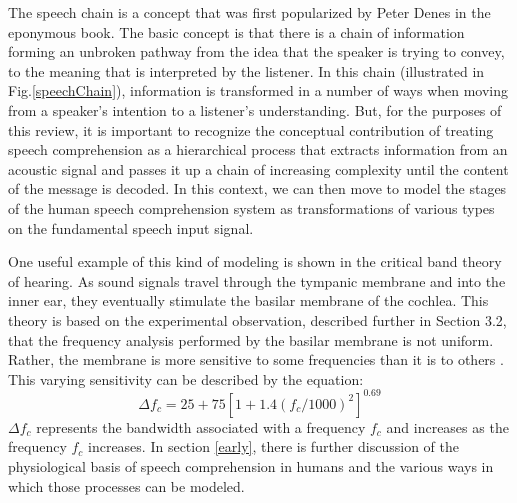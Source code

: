 \documentclass[titlepage]{article}
\begin{document}
    The speech chain is a concept that was first popularized by Peter Denes \cite{Denes1993}
    in the eponymous book. The basic concept is that there is a chain of information forming
    an unbroken pathway from the idea that the speaker is trying to convey, to the meaning that
    is interpreted by the listener. In this chain (illustrated in Fig.\ref{speechChain}), information
    is transformed in a number of ways when moving from a speaker's intention to a listener's
    understanding. But, for the purposes of this review, it is important to recognize the
    conceptual contribution of treating speech comprehension as a hierarchical process
    that extracts information from an acoustic signal and passes it up a chain of increasing
    complexity until the content of the message is decoded. In this context, we can then move
    to model the stages of the human speech comprehension system as transformations of
    various types on the fundamental speech input signal.


    One useful example of this kind of modeling is shown in the critical band theory of hearing.
    As sound signals travel through the tympanic membrane and into the inner ear, they
    eventually stimulate the basilar membrane of the cochlea.
    This theory is based on the experimental observation, described further in Section 3.2,
    that the frequency analysis performed
    by the basilar membrane is not uniform. Rather, the membrane is more sensitive
    to some frequencies than it is to others
    \cite{Fastl2007,Rabiner2007}. This varying sensitivity can be described by the equation:
    \begin{equation} \label{eq:1}
      \Delta f_c=25+75[1+1.4(f_c/1000)^2]^{0.69}
    \end{equation}
    $\Delta f_c$ represents the bandwidth associated with a frequency $f_c$ and increases
    as the frequency $f_c$ increases.
    In section \ref{early}, there is further discussion of the physiological
    basis of speech comprehension in
    humans and the various ways in which those processes can be modeled.
\end{document}
